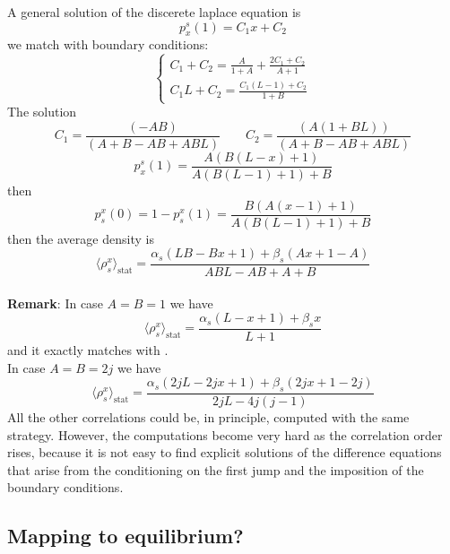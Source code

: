 \documentclass[11pt]{article}
\numberwithin{equation}{section}
\begin{document}
A general solution of the discerete laplace equation is
\begin{equation}
	p_{x}^{s}(1)=C_{1}x+C_{2}
\end{equation}
we match with boundary conditions:
\begin{equation}
	\begin{cases}
	C_{1}+C_{2}=\frac{A}{1+A}+\frac{2C_{1}+C_{2}}{A+1}\\
	C_{1}L+C_{2}=\frac{C_{1}(L-1)+C_{2}}{1+B}
	\end{cases}
\end{equation}
The solution
\begin{equation}
	C_{1}=\frac{(-A B)}{(A + B - A B + A B L)}\qquad C_{2}=\frac{(A (1 + B L))}{(A + B - A B + A B L)}
\end{equation}
\begin{equation}
	p_{x}^{s}(1)=\frac{A (B (L-x)+1)}{A (B (L-1)+1)+B}
\end{equation}
then 
\begin{equation}
	p^{x}_{s}(0)=1-p^{x}_{s}(1)=\frac{B (A (x-1)+1)}{A (B (L-1)+1)+B}
\end{equation}
then the average density is 
\begin{equation}
\langle\rho_{s}^{x}\rangle_{\text{stat}}=\frac{\alpha_{s}(LB-Bx+1)+\beta_{s}(Ax+1-A)}{ABL-AB+A+B}
\end{equation}
\newline \\
\textbf{Remark}: In case $A=B=1$ we have 
	\begin{equation}
\langle\rho_{s}^{x}\rangle_{\text{stat}}=\frac{\alpha_{s}(L-x+1)+\beta_{s}x}{L+1}
	\end{equation}
and it exactly matches with \cite{vanicat2017exact}. \\
In case $A=B=2j$ we have 
\begin{equation}
	\langle\rho_{s}^{x}\rangle_{\text{stat}}=\frac{\alpha_{s}(2jL-2jx+1)+\beta_{s}(2jx+1-2j)}{2jL-4j(j-1)}
\end{equation}
All the other correlations could be, in principle, computed with the same strategy. However, the computations become very hard as the correlation order rises, because it is not easy to find explicit solutions of the difference equations that arise from the conditioning on the first jump and the imposition of the boundary conditions. 
\subsection{Mapping to equilibrium?}
\end{document}
